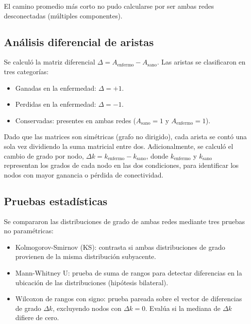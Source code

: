 \documentclass[conference]{IEEEtran}
\begin{document}
El camino promedio más corto no pudo calcularse por ser ambas redes desconectadas (múltiples componentes).

\subsection{Análisis diferencial de aristas}

Se calculó la matriz diferencial $\Delta = A_{\text{enfermo}} - A_{\text{sano}}$. Las aristas se clasificaron en tres categorías:

\begin{itemize}[leftmargin=*]
    \item Ganadas en la enfermedad: $\Delta = +1$.
    \item Perdidas en la enfermedad: $\Delta = -1$.
    \item Conservadas: presentes en ambas redes ($A_{\text{sano}} = 1$ y $A_{\text{enfermo}} = 1$).
\end{itemize}

Dado que las matrices son simétricas (grafo no dirigido), cada arista se contó una sola vez dividiendo la suma matricial entre dos. Adicionalmente, se calculó el cambio de grado por nodo, $\Delta k = k_{\text{enfermo}} - k_{\text{sano}}$, donde $k_{\text{enfermo}}$ y $k_{\text{sano}}$ representan los grados de cada nodo en las dos condiciones, para identificar los nodos con mayor ganancia o pérdida de conectividad.

\subsection{Pruebas estadísticas}

Se compararon las distribuciones de grado de ambas redes mediante tres pruebas no paramétricas:

\begin{itemize}[leftmargin=*]
    \item Kolmogorov-Smirnov (KS): contrasta si ambas distribuciones de grado provienen de la misma distribución subyacente.
    \item Mann-Whitney U: prueba de suma de rangos para detectar diferencias en la ubicación de las distribuciones (hipótesis bilateral).
    \item Wilcoxon de rangos con signo: prueba pareada sobre el vector de diferencias de grado $\Delta k$, excluyendo nodos con $\Delta k = 0$. Evalúa si la mediana de $\Delta k$ difiere de cero.
\end{itemize}
\end{document}
